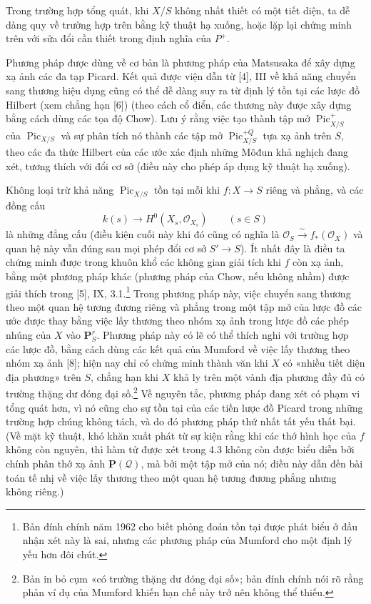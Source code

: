 Trong trường hợp tổng quát, khi $X/S$ không nhất thiết có một tiết diện, ta dễ
dàng quy về trường hợp trên bằng kỹ thuật hạ xuống, hoặc lặp lại chứng minh
trên với sửa đổi cần thiết trong định nghĩa của $P^+$.

 Phương pháp được dùng về cơ bản là phương pháp của
Matsusaka để xây dựng xạ ảnh các đa tạp Picard. Kết quả được viện dẫn từ [4],
III về khả năng chuyển sang thương hiệu dụng cũng có thể dễ dàng suy ra từ
định lý tồn tại các lược đồ Hilbert (xem chẳng hạn [6]) (theo cách cổ điển, các
thương này được xây dựng bằng cách dùng các tọa độ Chow). Lưu ý rằng việc tạo
thành tập mở $\operatorname{Pic}^{+}_{X/S}$ của
$\operatorname{Pic}_{X/S}$ và sự phân tích nó thành các tập mở
$\operatorname{Pic}^{+Q}_{X/S}$ tựa xạ ảnh trên $S$, theo các đa thức Hilbert
của các ước xác định những Môđun khả nghịch đang xét, tương thích với đổi cơ
sở (điều này cho phép áp dụng kỹ thuật hạ xuống).

 Không loại trừ khả năng
$\operatorname{Pic}_{X/S}$ tồn tại mỗi khi $f:X\longrightarrow S$ riêng và
phẳng, và các đồng cấu
\[
k(s)\longrightarrow H^0(X_s,\mathcal O_{X_s})\qquad(s\in S)
\]
là những đẳng cấu (điều kiện cuối này khi đó cũng có nghĩa là
$\mathcal O_S\xrightarrow{\sim}f_*(\mathcal O_X)$ và quan hệ này vẫn đúng sau
mọi phép đổi cơ sở $S'\longrightarrow S$). Ít nhất đây là điều ta chứng minh
được trong khuôn khổ các không gian giải tích khi $f$ còn xạ ảnh, bằng một
phương pháp khác (phương pháp của Chow, nếu không nhầm) được giải thích trong
[5], IX, 3.1.\footnote{Bản đính chính năm 1962 cho biết phỏng đoán tồn tại
được phát biểu ở đầu nhận xét này là sai, nhưng các phương pháp của Mumford cho
một định lý yếu hơn đôi chút.} Trong phương pháp này, việc chuyển sang
thương theo một quan hệ tương đương riêng và phẳng trong một tập mở của lược
đồ các ước được thay bằng việc lấy thương theo nhóm xạ ảnh trong lược đồ các
phép nhúng của $X$ vào $\mathbf P^r_S$. Phương pháp này có lẽ có thể thích nghi
với trường hợp các lược đồ, bằng cách dùng các kết quả của Mumford về việc lấy
thương theo nhóm xạ ảnh [8]; hiện nay chỉ có chứng minh thành văn khi $X$ có
«nhiều tiết diện địa phương» trên $S$, chẳng hạn khi $X$ khả ly trên một vành
địa phương đầy đủ có trường thặng dư đóng đại số.\footnote{Bản in bỏ cụm «có
trường thặng dư đóng đại số»; bản đính chính nói rõ rằng phản ví dụ của Mumford
khiến hạn chế này trở nên không thể thiếu.} Về nguyên tắc, phương pháp đang xét
có phạm vi tổng quát hơn, vì nó cũng cho sự tồn tại của các tiền lược đồ Picard
trong những trường hợp chúng không tách, và do đó phương pháp thứ nhất tất yếu
thất bại. (Về mặt kỹ thuật, khó khăn xuất phát từ sự kiện rằng khi các thớ hình
học của $f$ không còn nguyên, thì hàm tử được xét trong 4.3 không còn được biểu
diễn bởi chính phân thớ xạ ảnh $\mathbf P(\mathcal Q)$, mà bởi một tập mở của
nó; điều này dẫn đến bài toán tế nhị về việc lấy thương theo một quan hệ tương
đương phẳng nhưng không riêng.)

